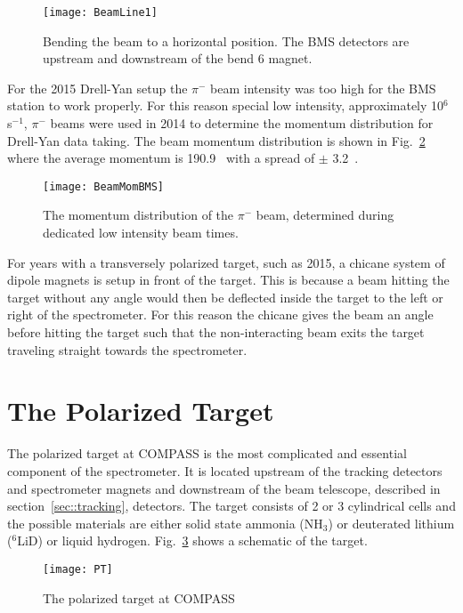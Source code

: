 \begin{figure}[h!t]
  \centering
  \texttt{[image: BeamLine1]}
  \caption{Bending the beam to a horizontal position.  The BMS detectors are
    upstream and downstream of the bend 6 magnet.}
  \label{fig::BeamLine1}
\end{figure}

For the 2015 Drell-Yan setup the $\pi^-$ beam intensity was too high for the BMS
station to work properly.  For this reason special low intensity, approximately
10$^6$ s$^{-1}$, $\pi^-$ beams were used in 2014 to determine the momentum
distribution for Drell-Yan data taking.  The beam momentum distribution is shown
in Fig.~\ref{fig::BeamMomBMS} where the average momentum is 190.9~{\gvc} with a
spread of $\pm$ 3.2~{\gvc}.

\begin{figure}[h!t]
  \centering
  \texttt{[image: BeamMomBMS]}
  \caption{The momentum distribution of the $\pi^-$ beam, determined during
    dedicated low intensity beam times.}
  \label{fig::BeamMomBMS}
\end{figure}

For years with a transversely polarized target, such as 2015, a chicane system
of dipole magnets is setup in front of the target.  This is because a beam
hitting the target without any angle would then be deflected inside the target
to the left or right of the spectrometer.  For this reason the chicane gives the
beam an angle before hitting the target such that the non-interacting beam exits
the target traveling straight towards the spectrometer.


\section{The Polarized Target}
The polarized target at COMPASS is the most complicated and essential component
of the spectrometer.  It is located upstream of the tracking detectors and
spectrometer magnets and downstream of the beam telescope, described in
section~\ref{sec::tracking}, detectors.  The target consists of 2 or 3
cylindrical cells and the possible materials are either solid state ammonia
(NH$_3$) or deuterated lithium ($^6$LiD) or liquid hydrogen. Fig.~\ref{fig::PT}
shows a schematic of the target.  \par

\begin{figure}[h!t]
  \centering
  \texttt{[image: PT]}
  \caption{The polarized target at COMPASS}
  \label{fig::PT}
\end{figure}

